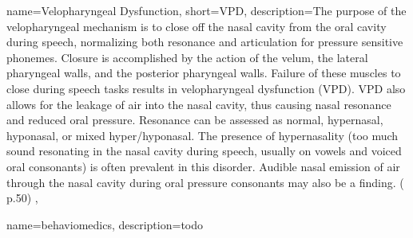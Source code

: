 
 {
	name={Velopharyngeal Dysfunction}, 
	short={VPD},
	description={The purpose of the velopharyngeal mechanism is to close off the nasal cavity from the oral cavity during speech, normalizing both resonance and articulation for pressure sensitive phonemes. Closure is accomplished by the action of the velum, the lateral pharyngeal walls, and the posterior pharyngeal walls. Failure of these muscles to close during speech tasks results in velopharyngeal dysfunction (VPD). VPD also allows for the leakage of air into the nasal cavity, thus causing nasal resonance and reduced oral pressure. Resonance can be assessed as normal, hypernasal, hyponasal, or mixed hyper/hyponasal. The presence of hypernasality (too much sound resonating in the nasal cavity during speech, usually on vowels and voiced oral consonants) is often prevalent in this disorder. Audible nasal emission of air through the nasal cavity during oral pressure consonants may also be a finding. (\cite{SLPathologies} p.50)
},
}

 {
	name={behaviomedics}, 
	description={todo
}
}








